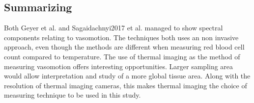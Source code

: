   
\subsection{Summarizing}

Both Geyer et al. and Sagaidachnyi2017 et al. managed to show spectral components relating to vasomotion. The techniques both uses an non invasive approach, even though the methods are different when measuring red blood cell count compared to temperature. The use of thermal imaging as the method of measuring vasomotion offers interesting opportunities. Larger sampling area would allow interpretation and study of a more global tissue area. Along with the resolution of thermal imaging cameras, this makes thermal imaging the choice of measuring technique to be used in this study. 




